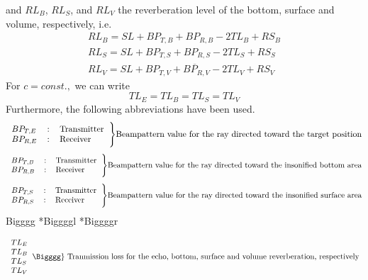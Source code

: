 \noindent and \textit{$RL_{B}$}, \textit{$RL_{S}$}, and \textit{$RL_{V}$} the reverberation level of the bottom, surface and volume, respectively, i.e.
\begin{equation}
\begin{gathered} 
RL_{B}  = SL + BP_{T,B} + BP_{R,B} - 2TL_{B} + RS_{B} \\
RL_{S}  = SL + BP_{T,S} + BP_{R,S} - 2TL_{S} + RS_{S} \\
RL_{V}  = SL + \overline{BP_{T,V} + BP_{R,V} - 2TL_{V}} + RS_{V}
\end{gathered} 
\end{equation}
\noindent For $ \textit{c} = const.,$ we can write
\begin{equation}
TL_{E}  =  TL_{B} = TL_{S} = TL_{V}  
\end{equation}
\noindent Furthermore, the following abbreviations have been used.
\[ 
\begin{tabular}{lll}
 $BP_{T,E}$ & : & Transmitter \\
 $BP_{R,E}$ & : & Receiver \\
\end{tabular}
\Bigg\} \textnormal{Beampattern value for the ray directed toward the target position}
\]
\[ 
\begin{tabular}{lll}
 $BP_{T,B}$ & : & Transmitter \\
 $BP_{R,B}$ & : & Receiver \\
\end{tabular}
\Bigg\} \textnormal{Beampattern value for the ray directed toward the insonified bottom area}
\]
\[ 
\begin{tabular}{lll}
 $BP_{T,S}$ & : & Transmitter \\
 $BP_{R,S}$ & : & Receiver \\
\end{tabular}
\Bigg\} \textnormal{Beampattern value for the ray directed toward the insonified surface area}
\]
\makeatletter
\newcommand\makebig[2]{%
  \@xp\newcommand\@xp*\csname#1\endcsname{\bBigg@{#2}}%
  \@xp\newcommand\@xp*\csname#1l\endcsname{\@xp\mathopen\csname#1\endcsname}%
  \@xp\newcommand\@xp*\csname#1r\endcsname{\@xp\mathclose\csname#1\endcsname}%
}
\makeatother
\makebig{Bigggg}{6.5}
\[ 
\begin{tabular}{l}
   $TL_{E}$ \\
   $TL_{B}$ \\
   $TL_{S}$ \\
   $TL_{V}$ \\
\end{tabular}
\Bigggg\} \textnormal{ Tranmission loss for the echo, bottom, surface and volume reverberation, respectively }
\]


